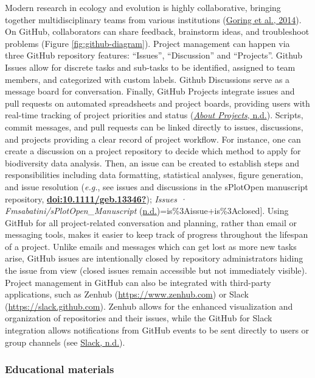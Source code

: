 Modern research in ecology and evolution is highly collaborative, bringing together multidisciplinary teams from various institutions (\protect\hyperlink{ref-1HhzKAC1K}{Goring et al., 2014}).
On GitHub, collaborators can share feedback, brainstorm ideas, and troubleshoot problems (Figure \ref{fig:github-diagram}).
Project management can happen via three GitHub repository features: ``Issues'', ``Discussion'' and ``Projects''.
Github Issues allow for discrete tasks and sub-tasks to be identified, assigned to team members, and categorized with custom labels.
Github Discussions serve as a message board for conversation.
Finally, GitHub Projects integrate issues and pull requests on automated spreadsheets and project boards, providing users with real-time tracking of project priorities and status (\protect\hyperlink{ref-RhBKe0MG}{\emph{About Projects}, n.d.}).
Scripts, commit messages, and pull requests can be linked directly to issues, discussions, and projects providing a clear record of project workflow.
For instance, one can create a discussion on a project repository to decide which method to apply for biodiversity data analysis.
Then, an issue can be created to establish steps and responsibilities including data formatting, statistical analyses, figure generation, and issue resolution (\emph{e.g.}, see issues and discussions in the sPlotOpen manuscript repository, \protect\hyperlink{ref-doi:10.1111ux2fgeb.13346}{\textbf{doi:10.1111/geb.13346?}}); \emph{Issues · Fmsabatini/sPlotOpen\_Manuscript} (\protect\hyperlink{ref-3UAritXO}{n.d.})=is\%3Aissue+is\%3Aclosed{]}.
Using GitHub for all project-related conversation and planning, rather than email or messaging tools, makes it easier to keep track of progress throughout the lifespan of a project.
Unlike emails and messages which can get lost as more new tasks arise, GitHub issues are intentionally closed by repository administrators hiding the issue from view (closed issues remain accessible but not immediately visible).
Project management in GitHub can also be integrated with third-party applications, such as Zenhub (\url{https://www.zenhub.com}) or Slack (\url{https://slack.github.com}).
Zenhub allows for the enhanced visualization and organization of repositories and their issues, while the GitHub for Slack integration allows notifications from GitHub events to be sent directly to users or group channels (see \protect\hyperlink{ref-1GRWGlDWy}{Slack, n.d.}).

\hypertarget{educational-materials}{%
\subsubsection{Educational materials}\label{educational-materials}}

